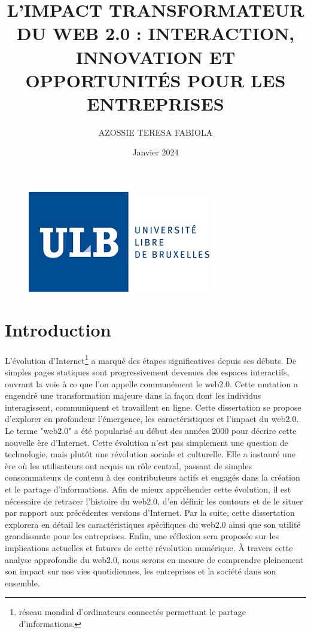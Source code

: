 \documentclass[12pt,a4paper]{article} %
\title{\textbf{L’IMPACT TRANSFORMATEUR DU WEB 2.0 : INTERACTION, INNOVATION ET OPPORTUNITÉS POUR LES ENTREPRISES} } %
\author{AZOSSIE TERESA FABIOLA} %
\date{Janvier 2024} %
\begin{document}
	
	\maketitle %
	\begin{figure}[h]
		
		\centering
		
		\includegraphics[scale=1]{ulb-logo}
		
	\end{figure}
	\tableofcontents %
	
	\section{Introduction}
	L'évolution d'Internet\footnote[1]{réseau mondial d'ordinateurs connectés permettant le partage d'informations.} a marqué des étapes significatives depuis ses débuts. De simples pages statiques sont progressivement devenues des espaces interactifs, ouvrant la voie à ce que l'on appelle communément le web2.0. Cette mutation a engendré une transformation majeure dans la façon dont les individus interagissent, communiquent et travaillent en ligne. Cette dissertation se propose d'explorer en profondeur l'émergence, les caractéristiques et l'impact du web2.0. Le terme "web2.0" a été popularisé au début des années 2000 pour décrire cette nouvelle ère d'Internet. Cette évolution n'est pas simplement une question de technologie, mais plutôt une révolution sociale et culturelle. Elle a instauré une ère où les utilisateurs ont acquis un rôle central, passant de simples consommateurs de contenu à des contributeurs actifs et engagés dans la création et le partage d'informations. Afin de mieux appréhender cette évolution, il est nécessaire de retracer l'histoire du web2.0, d'en définir les contours et de le situer par rapport aux précédentes versions d'Internet. Par la suite, cette dissertation explorera en détail les caractéristiques spécifiques du web2.0 ainsi que son utilité grandissante pour les entreprises. Enfin, une réflexion sera proposée sur les implications actuelles et futures de cette révolution numérique. À travers cette analyse approfondie du web2.0, nous serons en mesure de comprendre pleinement son impact sur nos vies quotidiennes, les entreprises et la société dans son ensemble.
\end{document}
